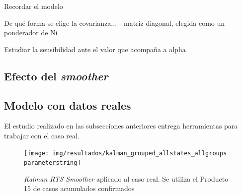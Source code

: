 Recordar el modelo 

De qué forma se elige la covarianza...
- matriz diagonal, elegida como un ponderador de Ni 

Estudiar la sensibilidad ante el valor que acompaña a alpha 

\subsection{Efecto del \textit{smoother}}\label{subsec:smoother}

\subsection{Modelo con datos reales}\label{subsec:datosreales}

El estudio realizado en las subsecciones anteriores entrega herramientas para trabajar con el caso real.

\begin{figure}[!h]
\centering
\texttt{[image: img/resultados/kalman\_grouped\_allstates\_allgroups\\parameterstring]}
\caption[\textit{Kalman RTS Smoother} aplicado al caso real ]{\textit{Kalman RTS Smoother} aplicado al caso real. Se utiliza el Producto 15 de casos acumulados confirmados}
\label{all-nohigh}
\end{figure}



